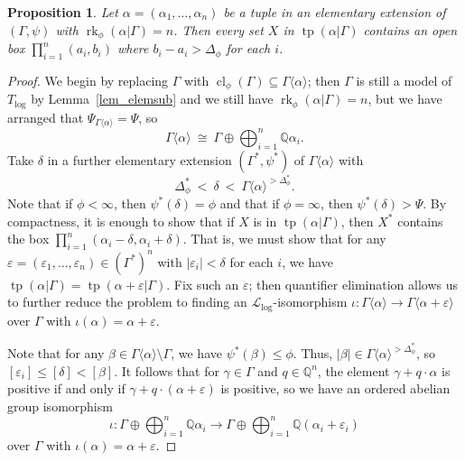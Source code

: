 \documentclass[11pt]{amsart}
\theoremstyle{plain}
\newtheorem{prop}[thm]{Proposition}
\theoremstyle{definition}
\numberwithin{equation}{section}
\newcommand\Q{\mathbb{Q}}
\newcommand\calL{\mathcal{L}}
\newcommand\0{\varnothing}
\DeclareMathOperator\rk{rk}
\begin{document}
\begin{prop}\label{prop_simpleextinterior}
Let $\alpha = (\alpha_1,\ldots,\alpha_n)$ be a tuple in an elementary extension of $(\Gamma,\psi)$ with $\rk_\phi(\alpha|\Gamma) = n$. Then  every set $X$ in $\operatorname{tp}(\alpha|\Gamma)$ contains an open box $\prod_{i=1}^n(a_i,b_i)$ where $b_i-a_i>\Delta_{\phi}$ for each $i$.
\end{prop}
\begin{proof}
We begin by replacing $\Gamma$ with $\operatorname{cl}_\phi(\Gamma)\subseteq \Gamma\langle \alpha\rangle$; then $\Gamma$ is still a model of $T_{\log}$ by Lemma~\ref{lem_elemsub} and we still have $\rk_\phi(\alpha|\Gamma)=n$, but we have arranged that $\Psi_{\Gamma\langle \alpha\rangle} = \Psi$, so 
\[
\Gamma \langle \alpha\rangle\ \cong\ \Gamma \oplus \bigoplus_{i=1}^n\Q\alpha_i.
\]
Take $\delta$ in a further elementary extension $(\Gamma^*,\psi^*)$ of $\Gamma\langle \alpha\rangle$ with 
\[
\Delta_\phi^*\ <\ \delta\ <\ \Gamma\langle \alpha\rangle^{>\Delta_\phi^*}. 
\]
Note that if $\phi<\infty$, then $\psi^*(\delta) = \phi$ and that if $\phi = \infty$, then $\psi^*(\delta)> \Psi$. By compactness, it is enough to show that if $X$ is in $\operatorname{tp}(\alpha|\Gamma)$, then $X^*$ contains the box $\prod_{i=1}^n(\alpha_i-\delta,\alpha_i+\delta)$. That is, we must show that for any $\varepsilon = (\varepsilon_1,\ldots,\varepsilon_n) \in (\Gamma^*)^n$ with $|\varepsilon_i|<\delta$ for each $i$, we have $\operatorname{tp}(\alpha|\Gamma) = \operatorname{tp}(\alpha+\varepsilon|\Gamma)$. Fix such an $\varepsilon$; then quantifier elimination allows us to further reduce the problem to finding an $\calL_{\log}$-isomorphism $\iota\colon\Gamma\langle \alpha\rangle \to \Gamma\langle \alpha+\varepsilon\rangle$ over $\Gamma$ with $\iota(\alpha)=\alpha+\varepsilon$. 

Note that for any $\beta \in \Gamma\langle \alpha\rangle \setminus \Gamma$, we have $\psi^*(\beta)\leq \phi$. Thus,  $|\beta| \in \Gamma\langle \alpha\rangle^{>\Delta_\phi^*}$, so $[\varepsilon_i]\leq [\delta]< [\beta]$. It follows that for $\gamma \in \Gamma$ and $q \in \Q^n$, the element $\gamma+ q\cdot \alpha$ is positive if and only if $\gamma+ q\cdot (\alpha+\varepsilon)$ is positive, so we have an ordered abelian group isomorphism 
\[
\iota \colon\Gamma\oplus\bigoplus_{i=1}^n\Q\alpha_i\to\Gamma\oplus\bigoplus_{i=1}^n\Q(\alpha_i+\varepsilon_i)
\]
over $\Gamma$ with $\iota(\alpha)=\alpha+\varepsilon$.


\end{proof}
\end{document}
